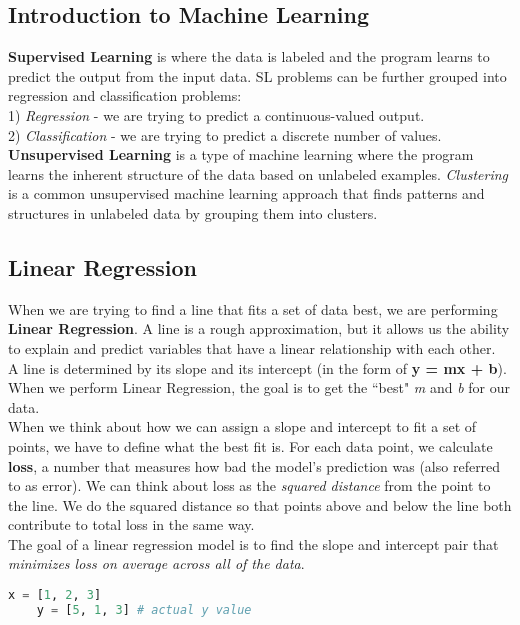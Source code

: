 \documentclass[11pt, a4paper]{article}
\begin{document}
\begin{spacing}{1.1}
	\subsection{Introduction to Machine Learning}
	\textbf{Supervised Learning} is where the data is labeled and the program learns to predict the output from the input data. SL problems can be further grouped into regression and classification problems: \vspace*{1mm} \\ 
	\hspace*{2mm} 1) \textit{Regression} - we are trying to predict a continuous-valued output. \\
	\hspace*{2mm} 2) \textit{Classification} - we are trying to predict a discrete number of values. \vspace*{2mm} \\ 
	\textbf{Unsupervised Learning} is a type of machine learning where the program learns the inherent structure of the data based on unlabeled examples. \textit{Clustering} is a common unsupervised machine learning approach that finds patterns and structures in unlabeled data by grouping them into clusters. \vspace*{1mm}
	\subsection{Linear Regression}
	When we are trying to find a line that fits a set of data best, we are performing \textbf{Linear Regression}. A line is a rough approximation, but it allows us the ability to explain and predict variables that have a linear relationship with each other. \vspace*{2mm} \\	
	A line is determined by its slope and its intercept (in the form of \textbf{y = mx + b}). When we perform Linear Regression, the goal is to get the ``best" \textit{m} and \textit{b} for our data. \vspace*{2mm} \\
	When we think about how we can assign a slope and intercept to fit a set of points, we have to define what the best fit is. For each data point, we calculate \textbf{loss}, a number that measures how bad the model’s prediction was (also referred to as error). We can think about loss as the \textit{squared distance} from the point to the line. We do the squared distance so that points above and below the line both contribute to total loss in the same way. \vspace*{2mm} \\
	The goal of a linear regression model is to find the slope and intercept pair that \textit{minimizes loss on average across all of the data}.
	\begin{lstlisting}[language=Python]
	x = [1, 2, 3]
	y = [5, 1, 3] # actual y value
	

\end{lstlisting}
\end{spacing}
\end{document}
